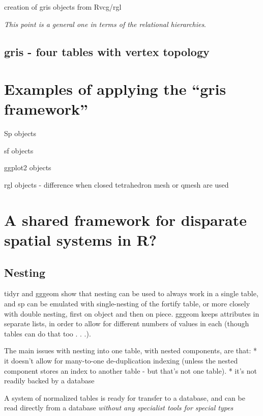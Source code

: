 \documentclass[]{book}
\begin{document}
creation of gris objects from Rvcg/rgl

\emph{This point is a general one in terms of the relational
hierarchies}.

\section{gris - four tables with vertex
topology}\label{gris---four-tables-with-vertex-topology}

\chapter{\texorpdfstring{Examples of applying the ``gris
framework''}{Examples of applying the gris framework}}\label{examples-of-applying-the-gris-framework}

Sp objects

sf objects

ggplot2 objects

rgl objects - difference when closed tetrahedron mesh or qmesh are used

\chapter{A shared framework for disparate spatial systems in
R?}\label{a-shared-framework-for-disparate-spatial-systems-in-r}

\section{Nesting}\label{nesting}

tidyr and gggeom show that nesting can be used to always work in a
single table, and sp can be emulated with single-nesting of the fortify
table, or more closely with double nesting, first on object and then on
piece. gggeom keeps attributes in separate lists, in order to allow for
different numbers of values in each (though tables can do that too . .
.).

The main issues with nesting into one table, with nested components, are
that: * it doesn't allow for many-to-one de-duplication indexing (unless
the nested component stores an index to another table - but that's not
one table). * it's not readily backed by a database

A system of normalized tables is ready for transfer to a database, and
can be read directly from a database \emph{without any specialist tools
for special types}
\end{document}
